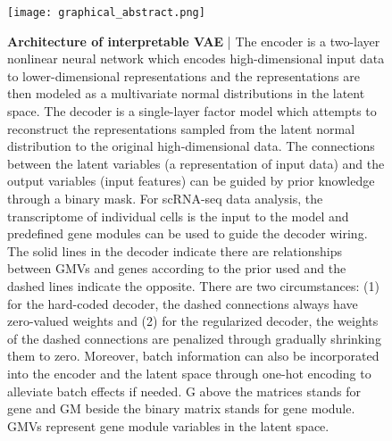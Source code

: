 \begin{figure}[h!]
    \centering
    \hspace*{-4.5mm}
    \texttt{[image: graphical\_abstract.png]}
    \caption{\small{\textbf{Architecture of interpretable VAE} | The encoder is a two-layer nonlinear neural network which encodes high-dimensional input data to lower-dimensional representations and the representations are then modeled as a multivariate normal distributions in the latent space. The decoder is a single-layer factor model which attempts to reconstruct the representations sampled from the latent normal distribution to the original high-dimensional data. The connections between the latent variables (a representation of input data) and the output variables (input features) can be guided by prior knowledge through a binary mask. For scRNA-seq data analysis, the transcriptome of individual cells is the input to the model and predefined gene modules can be used to guide the decoder wiring. The solid lines in the decoder indicate there are relationships between GMVs and genes according to the prior used and the dashed lines indicate the opposite. There are two circumstances: (1) for the hard-coded decoder, the dashed connections always have zero-valued weights and (2) for the regularized decoder, the weights of the dashed connections are penalized through gradually shrinking them to zero. Moreover, batch information can also be incorporated into the encoder and the latent space through one-hot encoding to alleviate batch effects if needed. G above the matrices stands for gene and GM beside the binary matrix stands for gene module. GMVs represent gene module variables in the latent space.}}
    \label{fig:graphical_abstract}
\end{figure}

